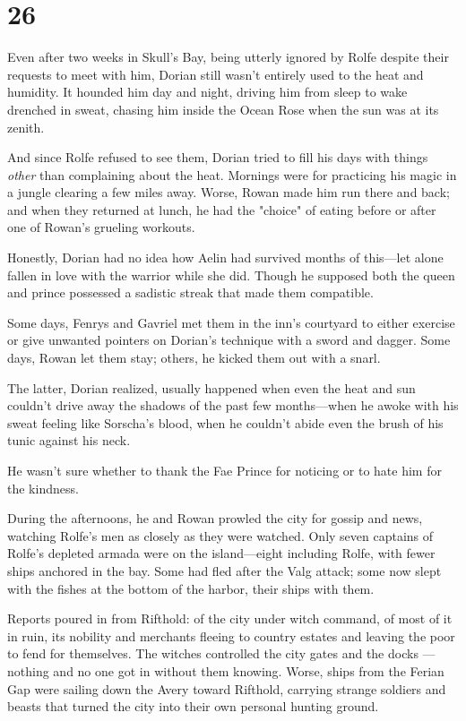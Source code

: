 
\chapter{26}

Even after two weeks in Skull's Bay, being utterly ignored by Rolfe despite their requests to meet with him, Dorian still wasn't entirely used to the heat and humidity. It hounded him day and night, driving him from sleep to wake drenched in sweat, chasing him inside the Ocean Rose when the sun was at its zenith.

And since Rolfe refused to see them, Dorian tried to fill his days with things \emph{other} than complaining about the heat. Mornings were for practicing his magic in a jungle clearing a few miles away. Worse, Rowan made him run there and back; and when they returned at lunch, he had the "choice" of eating before or after one of Rowan's grueling workouts.

Honestly, Dorian had no idea how Aelin had survived months of this---let alone fallen in love with the warrior while she did. Though he supposed both the queen and prince possessed a sadistic streak that made them compatible.

Some days, Fenrys and Gavriel met them in the inn's courtyard to either exercise or give unwanted pointers on Dorian's technique with a sword and dagger. Some days, Rowan let them stay; others, he kicked them out with a snarl.

The latter, Dorian realized, usually happened when even the heat and sun couldn't drive away the shadows of the past few months---when he awoke with his sweat feeling like Sorscha's blood, when he couldn't abide even the brush of his tunic against his neck.

He wasn't sure whether to thank the Fae Prince for noticing or to hate him for the kindness.

During the afternoons, he and Rowan prowled the city for gossip and news, watching Rolfe's men as closely as they were watched. Only seven captains of Rolfe's depleted armada were on the island---eight including Rolfe, with fewer ships anchored in the bay. Some had fled after the Valg attack; some now slept with the fishes at the bottom of the harbor, their ships with them.

Reports poured in from Rifthold: of the city under witch command, of most of it in ruin, its nobility and merchants fleeing to country estates and leaving the poor to fend for themselves. The witches controlled the city gates and the docks ---nothing and no one got in without them knowing. Worse, ships from the Ferian Gap were sailing down the Avery toward Rifthold, carrying strange soldiers and beasts that turned the city into their own personal hunting ground.

